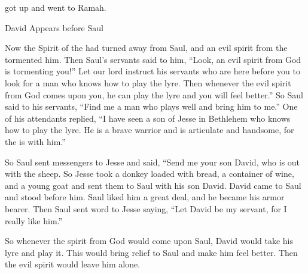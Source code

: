 {got
up and went
to Ramah.
\par }{\SH David Appears before Saul
\par }{\PP {}Now the Spirit
of the {}
had turned
away
from Saul,
and an evil
spirit
from the
{}
tormented him.
Then Saul’s
servants
said to him,
“Look,
an evil
spirit
from God
is tormenting you!”
Let
our lord
instruct his servants
who are here before
you to look
for a man
who knows
how to play
the lyre.
Then whenever
the evil
spirit
from God
comes upon you, he can play
the lyre
and you will feel better.”
So Saul
said
to
his servants,
“Find
me
a man
who plays
well
and bring
him to me.”
One
of his attendants
replied, “I have seen
a son
of Jesse
in Bethlehem
who knows
how to play
the lyre. He is a brave warrior
and is articulate
and handsome,
for the
{}
is with him.”
\par }{\PP {}So Saul
sent
messengers
to
Jesse
and said,
“Send
me
your son
David,
who
is out with the sheep.
So Jesse
took
a donkey
loaded with bread,
a container
of wine,
and a young
goat
and sent
them to
Saul
with his
son
David.
David
came
to
Saul
and stood
before
him. Saul liked
him a great
deal, and he became
his armor
bearer.
Then Saul
sent
word to
Jesse
saying,
“Let
David
be my servant,
for
I really like him.”
\par }{\PP {}So whenever
the spirit
from God
would come upon
Saul,
David
would take
his lyre
and play
it. This would bring relief
to Saul
and make him feel
better. Then the evil
spirit
would leave him alone.

}
